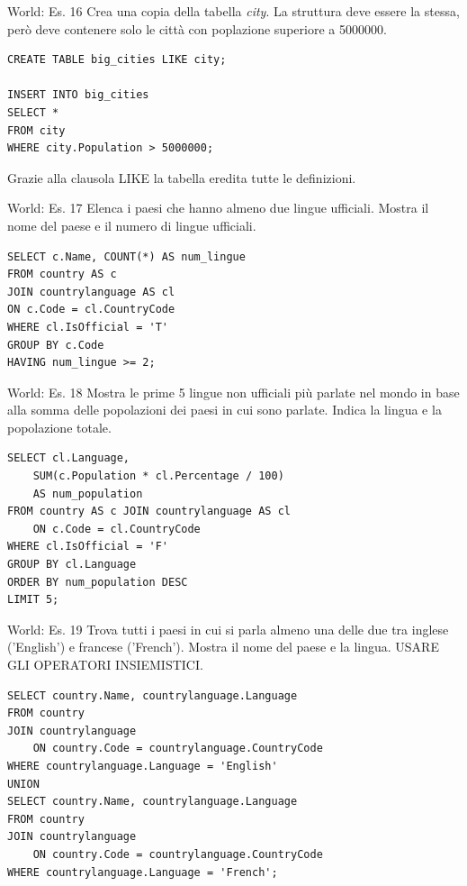 \begin{frame}[fragile]{World: Es. 16}
Crea una copia della tabella \textit{city}.
La struttura deve essere la stessa, per\`o deve contenere solo le citt\`a con poplazione superiore a 5000000.
\begin{lstlisting}
CREATE TABLE big_cities LIKE city;

INSERT INTO big_cities
SELECT *
FROM city
WHERE city.Population > 5000000;
\end{lstlisting}
Grazie alla clausola LIKE la tabella eredita tutte le definizioni.
\end{frame}
%

\begin{frame}[fragile]{World: Es. 17}
Elenca i paesi che hanno almeno due lingue ufficiali. Mostra il nome del paese e il numero di lingue ufficiali.
\pause
\begin{lstlisting}
SELECT c.Name, COUNT(*) AS num_lingue
FROM country AS c
JOIN countrylanguage AS cl
ON c.Code = cl.CountryCode
WHERE cl.IsOfficial = 'T'
GROUP BY c.Code
HAVING num_lingue >= 2;
\end{lstlisting}
\end{frame}
%

\begin{frame}[fragile]{World: Es. 18}
Mostra le prime 5 lingue non ufficiali pi\`u parlate nel mondo in base alla somma delle 
popolazioni dei paesi in cui sono parlate. Indica la lingua e la popolazione totale.
\pause
\begin{lstlisting}
SELECT cl.Language, 
    SUM(c.Population * cl.Percentage / 100) 
    AS num_population
FROM country AS c JOIN countrylanguage AS cl 
    ON c.Code = cl.CountryCode
WHERE cl.IsOfficial = 'F'
GROUP BY cl.Language
ORDER BY num_population DESC
LIMIT 5;
\end{lstlisting}
\end{frame}
%

\begin{frame}[fragile]{World: Es. 19}
Trova tutti i paesi in cui si parla almeno una delle due tra inglese ('English') e francese ('French'). 
Mostra il nome del paese e la lingua.
USARE GLI OPERATORI INSIEMISTICI.
\pause
\begin{lstlisting}
SELECT country.Name, countrylanguage.Language
FROM country
JOIN countrylanguage 
    ON country.Code = countrylanguage.CountryCode
WHERE countrylanguage.Language = 'English'
UNION
SELECT country.Name, countrylanguage.Language
FROM country
JOIN countrylanguage 
    ON country.Code = countrylanguage.CountryCode
WHERE countrylanguage.Language = 'French';
\end{lstlisting}
\end{frame}
%

